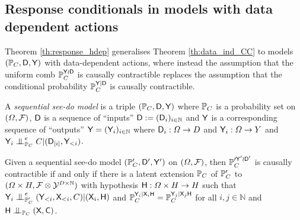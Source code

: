 \subsection{Response conditionals in models with data dependent actions}

Theorem \ref{th:response_hdep} generalises Theorem \ref{th:data_ind_CC} to models $(\mathbb{P}_C,\mathsf{D},\mathsf{Y})$ with data-dependent actions, where instead the assumption that the uniform comb $\mathbb{P}_C^{\mathsf{Y}\wr \mathsf{D}}$ is causally contractible replaces the assumption that the conditional probability $\mathbb{P}_C^{\mathsf{Y}| \mathsf{D}}$ is causally contractible.

\begin{definition}
A \emph{sequential see-do model} is a triple $(\mathbb{P}_C,\mathsf{D},\mathsf{Y})$ where $\mathbb{P}_C$ is a probability set on $(\Omega,\mathcal{F})$, $\mathsf{D}$ is a sequence of ``inputs'' $\mathsf{D}:=(\mathsf{D}_i)_{i\in\mathbb{N}}$ and $\mathsf{Y}$ is a corresponding sequence of ``outputs'' $\mathsf{Y}=(\mathsf{Y}_i)_{i\in\mathbb{N}}$ where $\mathsf{D}_i:\Omega\to D$ and $\mathsf{Y}_i:\Omega\to Y$ and $\RV{Y}_i\CI^e_{\prob{P}_C} C|(\RV{D}_{[i]},\RV{Y}_{<i})$.
\end{definition}

\begin{theorem}[]\label{th:response_hdep}
Given a sequential see-do model $(\mathbb{P}_C',\mathsf{D}',\mathsf{Y}')$ on $(\Omega,\mathcal{F})$, then $\mathbb{P}_C^{\prime \mathsf{Y}'\wr \mathsf{D}'}$ is causally contractible if and only if there is a latent extension $\mathbb{P}_C$ of $\mathbb{P}_C'$ to $(\Omega\times H,\mathcal{F}\otimes\mathcal{Y}^{D\times\mathbb{N}})$ with hypothesis $\mathsf{H}:\Omega\times H\to H$ such that $\RV{Y}_i\CI^e_{\prob{P}_C'} (\RV{Y}_{<i},\RV{X}_{<i},C)|(\RV{X}_i,\RV{H})$ and $\mathbb{P}_C^{\mathsf{Y}_i|\mathsf{X}_i\mathsf{H}}=\mathbb{P}_C^{\mathsf{Y}_j|\mathsf{X}_j\mathsf{H}}$ for all $i,j\in \mathbb{N}$ and $\RV{H}\CI_{\prob{P}_C} (\RV{X},\RV{C})$.
\end{theorem}


